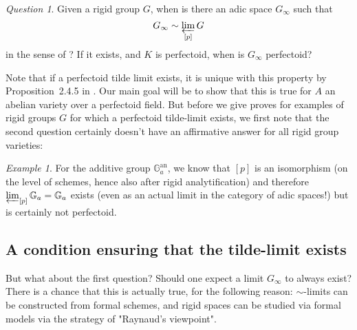 \documentclass[11pt,oneside]{amsart}
\theoremstyle{definition}
\theoremstyle{remark}
\newtheorem*{example}{Example}
\newtheorem*{question}{Question}
\begin{document}
	\begin{framed}
	\begin{question}
		Given a rigid group $G$, when is there an adic space $G_\infty$ such that \[G_\infty \sim  \varprojlim_{[p]} G\] in the sense of \cite{SW}? If it exists, and $K$ is perfectoid, when is $G_\infty$ perfectoid?
	\end{question}
	\end{framed}
	Note that if a perfectoid tilde limit exists, it is unique with this property by Proposition~2.4.5 in \cite{SW}.
	Our main goal will be to show that this is true for $A$ an abelian variety over a perfectoid field.
	But before we give proves for examples of rigid groups $G$ for which a perfectoid tilde-limit exists, we first note that the second question certainly doesn't have an affirmative answer for all rigid group varieties:
	\begin{example}
		For the additive group $\mathbb G_a^{\operatorname{an}}$, we know that $[p]$ is an isomorphism (on the level of schemes, hence also after rigid analytification) and therefore $\varprojlim_{[p]} \mathbb G_a=\mathbb G_a$ exists (even as an actual limit in the category of adic spaces!) but is certainly not perfectoid.
	\end{example}
	\subsection{A condition ensuring that the tilde-limit exists}
	But what about the first question? Should one expect a limit $G_\infty$ to always exist? There is a chance that this is actually true, for the following reason: $\sim$-limits can be constructed from formal schemes, and rigid spaces can be studied via formal models via the strategy of "Raynaud's viewpoint".
	
\end{document}
